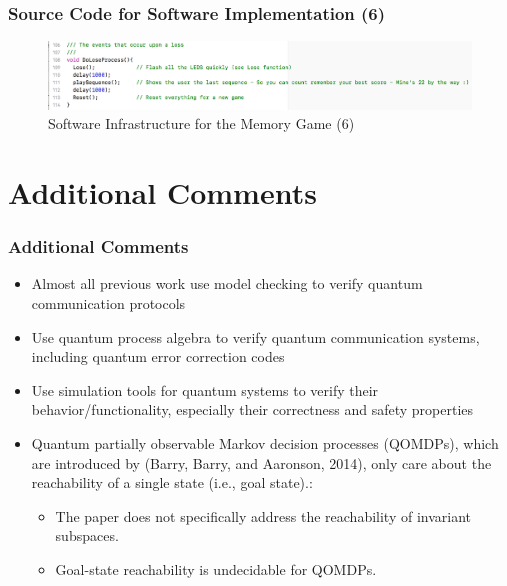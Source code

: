 \documentclass[xcolor={usenames,dvipsnames},hyperref={hyperindex,bookmarks}]{beamer}
\begin{document}
\frame
{
	\frametitle{Source Code for Software Implementation (6)}

\begin{figure}[h]
\centering 
\includegraphics[height=0.7 in]{./pics/sw-infrastructure5}
\caption{Software Infrastructure for the Memory Game (6)}
\label{fig:swinfrastructure5}
\end{figure}
}











\section{Additional Comments}

\frame
{
	\frametitle{Additional Comments}

	\begin{itemize}
	\item Almost all previous work use model checking to verify quantum communication protocols
	\item Use quantum process algebra to verify quantum communication systems, including quantum error correction codes
	\item Use simulation tools for quantum systems to verify their behavior/functionality, especially their correctness and safety properties
	\item Quantum partially observable Markov decision processes (QOMDPs), which are introduced by (Barry, Barry, and Aaronson, 2014), only care about the reachability of a single state (i.e., goal state).: %
		\begin{itemize} \itemsep -2pt
		\item The paper does not specifically address the reachability of invariant subspaces.
		\item Goal-state reachability is undecidable for QOMDPs.
		\end{itemize}
	\end{itemize}
}
\end{document}
